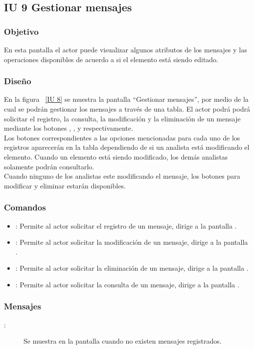 \subsection{IU 9 Gestionar mensajes}
\subsubsection{Objetivo}
	
	En esta pantalla el actor puede visualizar algunos atributos de los mensajes y las operaciones disponibles de acuerdo a si el elemento está siendo editado.

\subsubsection{Diseño}

    En la figura ~\ref{IU 8} se muestra la pantalla ``Gestionar mensajes'', por medio de la cual 
    se podrán gestionar los mensajes a través de una tabla.
    El actor podrá podrá solicitar el registro, la consulta, la modificación y la eliminación de un mensaje mediante los botones
    , \btnConsulta, \btnEditar y \btnEliminar respectivamente. \\
    
    Los botones correspondientes a las opciones mencionadas para cada uno de los registros aparecerán en la tabla dependiendo de si 
    un analista está modificando el elemento. Cuando un elemento está siendo modificado, los demás analistas solamente podrán consultarlo.\\
   
    Cuando ninguno de los analistas este modificando el mensaje, los botones para modificar y eliminar estarán disponibles.
    


\subsubsection{Comandos}
\begin{itemize}
	\item {}: Permite al actor solicitar el registro de un mensaje, dirige a la pantalla .
	\item \btnEditar[Modificar]: Permite al actor solicitar la modificación de un mensaje, dirige a la pantalla .
	\item \btnEliminar[Eliminar]: Permite al actor solicitar la eliminación de un mensaje, dirige a la pantalla .
	\item \btnConsulta[Consultar]: Permite al actor solicitar la consulta de un mensaje, dirige a la pantalla .
\end{itemize}

\subsubsection{Mensajes}

	
\begin{description}
	\item[:] Se muestra en la pantalla  cuando no existen mensajes registrados.
\end{description}
